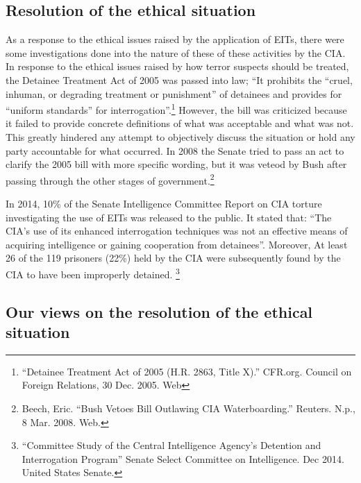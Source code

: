 \documentclass{article}
\newcommand{\q}[1]{``#1''}
\begin{document}
\subsection{Resolution of the ethical situation}
As a response to the ethical issues raised by the application of EITs, there were some investigations done into the nature of these of these activities by the CIA. In response to the ethical issues raised by how terror suspects should be treated, the Detainee Treatment Act of 2005 was passed into law; \q{It prohibits the \q{cruel, inhuman, or degrading treatment or punishment} of detainees and provides for \q{uniform standards} for interrogation}.\footnote{\q{Detainee Treatment Act of 2005 (H.R. 2863, Title X).} CFR.org. Council on Foreign Relations, 30 Dec. 2005. Web} However, the bill was criticized because it failed to provide concrete definitions of what was acceptable and what was not. This greatly hindered any attempt to objectively discuss the situation or hold any party accountable for what occurred. In 2008 the Senate tried to pass an act to clarify the 2005 bill with more specific wording, but it was veteod by Bush after passing through the other stages of government.\footnote{Beech, Eric. \q{Bush Vetoes Bill Outlawing CIA Waterboarding.} Reuters. N.p., 8 Mar. 2008. Web.} \par
\vspace{8pt}
In 2014, 10\% of the Senate Intelligence Committee Report on CIA torture investigating the use of EITs was released to the public. It stated that: \q{The CIA's use of its enhanced interrogation techniques was not an effective means of acquiring intelligence or gaining cooperation from detainees}. Moreover, At least 26 of the 119 prisoners (22\%) held by the CIA were subsequently found by the CIA to have been improperly detained.  \footnote{\q{Committee Study of the Central Intelligence Agency's Detention and Interrogation Program} Senate Select Committee on Intelligence. Dec 2014. United States Senate.} \par
\pagebreak
\vspace{10pt}
\subsection{Our views on the resolution of the ethical situation}
\end{document}

